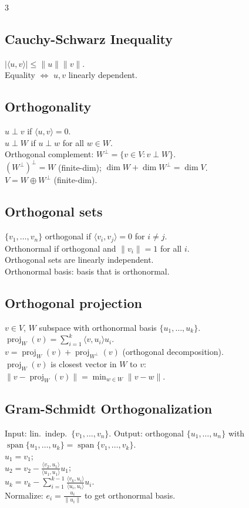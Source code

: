 \documentclass[10pt]{article}
\newcommand{\spann}{\operatorname{span}}
\newcommand{\proj}{\operatorname{proj}}
\begin{document}
\begin{multicols}{3}
\subsection*{Cauchy-Schwarz Inequality}
$|\langle u,v\rangle|\le\|u\|\|v\|$.\\
Equality $\Leftrightarrow$ $u,v$ linearly dependent.

\subsection*{Orthogonality}
$u\perp v$ if $\langle u,v\rangle=0$.\\
$u\perp W$ if $u\perp w$ for all $w\in W$.\\
Orthogonal complement: $W^\perp=\{v\in V:v\perp W\}$.\\
$(W^\perp)^\perp=W$ (finite-dim); $\dim W+\dim W^\perp=\dim V$.\\
$V=W\oplus W^\perp$ (finite-dim).

\subsection*{Orthogonal sets}
$\{v_1,\ldots,v_n\}$ orthogonal if $\langle v_i,v_j\rangle=0$ for $i\neq j$.\\
Orthonormal if orthogonal and $\|v_i\|=1$ for all $i$.\\
Orthogonal sets are linearly independent.\\
Orthonormal basis: basis that is orthonormal.

\subsection*{Orthogonal projection}
$v\in V$, $W$ subspace with orthonormal basis $\{u_1,\ldots,u_k\}$.\\
$\proj_W(v)=\sum_{i=1}^k\langle v,u_i\rangle u_i$.\\
$v=\proj_W(v)+\proj_{W^\perp}(v)$ (orthogonal decomposition).\\
$\proj_W(v)$ is closest vector in $W$ to $v$: $\|v-\proj_W(v)\|=\min_{w\in W}\|v-w\|$.

\subsection*{Gram-Schmidt Orthogonalization}
Input: lin.\ indep.\ $\{v_1,\ldots,v_n\}$. Output: orthogonal $\{u_1,\ldots,u_n\}$ with $\spann\{u_1,\ldots,u_k\}=\spann\{v_1,\ldots,v_k\}$.\\
$u_1=v_1$;\\
$u_2=v_2-\frac{\langle v_2,u_1\rangle}{\langle u_1,u_1\rangle}u_1$;\\
$u_k=v_k-\sum_{i=1}^{k-1}\frac{\langle v_k,u_i\rangle}{\langle u_i,u_i\rangle}u_i$.\\
Normalize: $e_i=\frac{u_i}{\|u_i\|}$ to get orthonormal basis.


\end{multicols}
\end{document}
